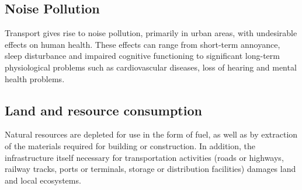 \subsection{Noise Pollution}
Transport gives rise to noise pollution, primarily in urban areas, with undesirable effects on human health. These effects can range from short-term annoyance, sleep disturbance and impaired cognitive functioning to significant long-term physiological problems such as cardiovascular diseases, loss of hearing and mental health problems.
\subsection{Land and resource consumption}
Natural resources are depleted for use in the form of fuel, as well as by extraction of the materials required for building or construction. In addition, the infrastructure itself necessary for transportation activities (roads or highways, railway tracks, ports or terminals, storage or distribution facilities) damages land and local ecosystems.
%
